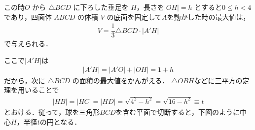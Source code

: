 \documentclass[../../main.tex]{subfiles}
\begin{document}
この時$O$ から $\triangle BCD$ に下ろした垂足を $H$，長さを$|OH| = h$ とすると$0 \le h < 4$であり，四面体 $ABCD$ の体積 $V$ の底面を固定して$A$を動かした時の最大値は，
\begin{align}
  V = \dfrac{1}{3} \triangle BCD \cdot |A'H| \label{eq:1}
\end{align}
で与えられる．

ここで$|A'H|$は
\begin{align}
  |A'H| = |A'O| + |OH| = 1 + h \label{eq:2}
\end{align}
だから，次に $\triangle BCD$ の面積の最大値をかんがえる．
$\triangle OBH$などに三平方の定理を用いることで
\begin{align}
  |HB| = |HC| = |HD| = \sqrt{4^2-h^2} = \sqrt{16-h^2} \equiv t \label{eq:3}
\end{align}
とおける．従って，球を三角形$BCD$を含む平面で切断すると，下図のように中心$H$，半径$t$の円となる．
\end{document}
